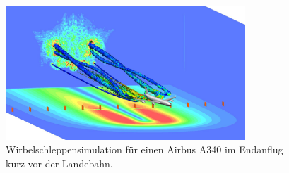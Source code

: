 \begin{figure}
\centering
\includegraphics[width=0.8\textwidth]{papers/wirbelringe/fig/wirbelschleppen_in_der_simulation.jpg}
\caption{Wirbelschleppensimulation für einen Airbus A340 im Endanflug kurz vor der Landebahn. 
\cite{Wirbelringe:wirbelschleppen_in_der_simulation} \label{Wirbelringe:fig:wirbelschleppen_in_der_simulation}}
\end{figure}